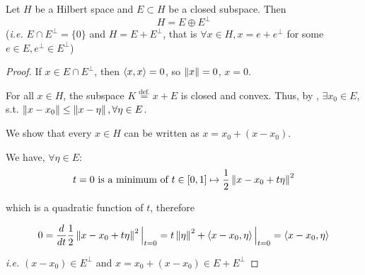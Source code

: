 \documentclass{article}
\begin{document}
\begin{corollary} \nextline
Let $H$ be a Hilbert space and $E \subset H$ be a closed subspace. Then  
$$
H = E \oplus E^{\perp}
$$  
(\textit{i.e.} $E \cap E^{\perp} = \{0\}$ and $H = E + E^{\perp}$, that is $\forall x \in H, x=e+ e^{\perp}$ for some $e \in E, e^{\perp} \in E^{\perp}$)
\end{corollary}

\begin{proof}
If $x \in E\cap E^{\perp}$, then $\left<{x},{x}\right>=0$, so $\left\|{x}\right\|=0$, $x=0$.  

For all $x\in H$, the subspace $K\overset{\text{def.}}{=}x+E$ is closed and convex. 
Thus, by , $\exists x_0 \in E$, s.t. $\left\|{x-x_0}\right\| \leq \left\|{x-\eta}\right\|, \forall \eta \in E$.
\begin{unexaminable}
    We show that every $x\in H$ can be written as $x=x_0+(x-x_0)$.
\end{unexaminable}

We have, $\forall \eta \in E$:  
\begin{equation*}
    t=0 \text{\ is\ a\ minimum\ of\ } t\in [0,1] \mapsto \frac{1}{2} \left\|{x-x_0+t\eta}\right\|^2
\end{equation*} 

which is a quadratic function of $t$, therefore  

\begin{equation*}
    0=\frac{d}{dt}\frac{1}{2} \left\|{x-x_0+t\eta}\right\|^2 \Big|_{t=0} = t\left\|{\eta}\right\|^2 + \left<{x-x_0},{\eta}\right> \Big|_{t=0}=\left<{x-x_0},{\eta}\right>
\end{equation*}

\textit{i.e.} $(x-x_0) \in E^{\perp}$ and $x=x_0+(x-x_0) \in E+E^{\perp}$
\end{proof}
\end{document}
